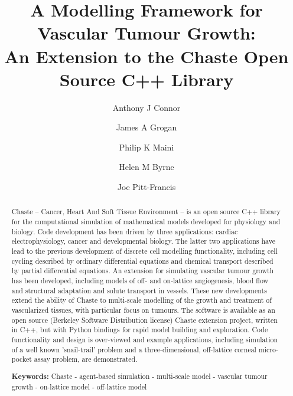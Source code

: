\documentclass[superscriptaddress, a4paper]{article}
\begin{document}
\title{A Modelling Framework for Vascular Tumour Growth: \\An Extension to the Chaste Open Source C++ Library}

\author[1,2]{Anthony J Connor}
\author[1]{James A Grogan}
\author[1]{Philip K Maini}
\author[1,2]{Helen M Byrne}
\author[2]{Joe Pitt-Francis}
 
  
\date{}
  
\maketitle

\begin{abstract}
Chaste -- Cancer, Heart And Soft Tissue Environment -- is an open source C++ library for the computational simulation of mathematical models developed for physiology and biology. Code development has been driven by three applications: cardiac electrophysiology, cancer and developmental biology. The latter two applications have lead to the previous development of discrete cell modelling functionality, including cell cycling described by ordinary differential equations and chemical transport described by partial differential equations. An extension for simulating vascular tumour growth has been developed, including models of off- and on-lattice angiogenesis, blood flow and structural adaptation and solute transport in vessels. These new developments extend the ability of Chaste to multi-scale modelling of the growth and treatment of vascularized tissues, with particular focus on tumours. The software is available as an open source (Berkeley Software Distribution license) Chaste extension project, written in C++, but with Python bindings for rapid model building and exploration. Code functionality and design is over-viewed and example applications, including simulation of a well known 'snail-trail' problem and a three-dimensional, off-lattice corneal micro-pocket assay problem, are demonstrated.

\smallskip
\noindent \textbf{Keywords:} Chaste - agent-based simulation - multi-scale model - vascular tumour growth - on-lattice model - off-lattice model

\end{abstract}
\end{document}
